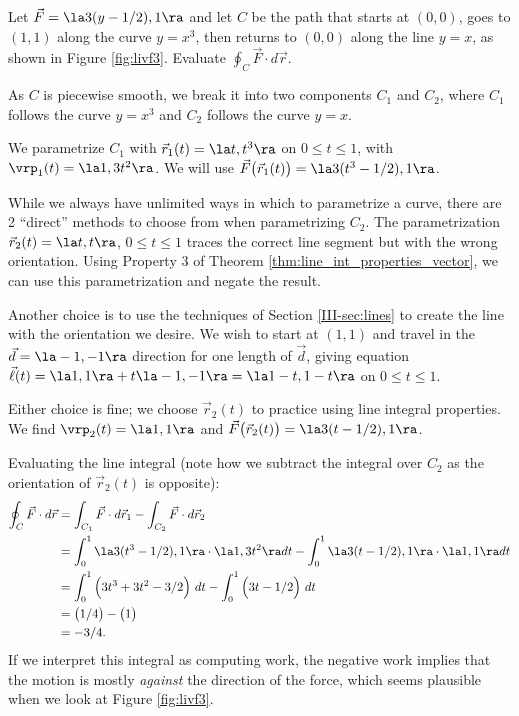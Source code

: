 {Let $\vec F = \la 3(y-1/2),1\ra$ and let $C$ be the path that starts at $(0,0)$, goes to $(1,1)$ along the curve $y=x^3$, then returns to $(0,0)$ along the line $y=x$, as shown in Figure \ref{fig:livf3}. Evaluate $\oint_C \vec F\cdot d\vec r$.
}
{As $C$ is piecewise smooth, we break it into two components $C_1$ and $C_2$, where $C_1$ follows the curve $y=x^3$ and $C_2$ follows the curve $y=x$. 

We parametrize $C_1$ with $\vec r_1(t) = \la t, t^3\ra$ on $0\leq t\leq 1$, with $\vrp_1(t) = \la 1,3t^2\ra$. We will use $\vec F\big(\vec r_1(t)\big) = \la 3(t^3-1/2),1\ra$.

While we always have unlimited ways in which to parametrize a curve, there are 2 ``direct'' methods to choose from when parametrizing $C_2$. The parametrization $\vec r_2(t)=\la t,t\ra$, $0\leq t\leq 1$ traces the correct line segment but with the wrong orientation. Using Property 3 of Theorem \ref{thm:line_int_properties_vector}, we can use this parametrization and negate the result.

Another choice is to use the techniques of Section \ref{III-sec:lines} to create the line with the orientation we desire. We wish to start at $( 1,1)$ and travel in the $\vec d = \la -1,-1\ra$ direction for one length of $\vec d$, giving equation $\vec \ell(t) = \la 1,1\ra + t\la -1,-1\ra = \la 1-t,1-t\ra$ on $0\leq t\leq 1$.

Either choice is fine; we choose $\vec r_2(t)$ to practice using line integral properties. We find $\vrp_2(t) = \la 1,1\ra$ and $\vec F\big(\vec r_2(t)\big) = \la 3(t-1/2),1\ra$.

Evaluating the line integral (note how we subtract the integral over $C_2$ as the orientation of $\vec r_2(t)$ is opposite):
\begin{align*}
\oint_C \vec F\cdot d\vec r &= \int_{C_1}\vec F\cdot d\vec r_1 - \int_{C_2}\vec F\cdot d\vec r_2 \\
			&= \int_0^1 \la 3(t^3-1/2),1\ra\cdot \la 1,3t^2\ra dt- \int_0^1 \la 3(t-1/2),1\ra\cdot\la 1,1\ra dt \\
			&= \int_0^1\Big(3t^3+3t^2-3/2\Big)\ dt - \int_0^1 \Big(3t-1/2\Big)\ dt\\
			&= \big(1/4 \big) - \big(1\big)\\
			&=	-3/4.
\end{align*}
If we interpret this integral as computing work, the negative work implies that the motion is mostly \emph{against} the direction of the force, which seems plausible when we look at Figure \ref{fig:livf3}.
}\\

